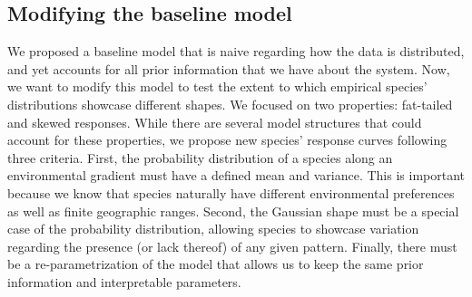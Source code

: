 \documentclass[11pt, a4paper]{article}
\begin{document}
\subsection*{Modifying the baseline model}


We proposed a baseline model that is naive regarding how the data is distributed, and yet accounts for all prior information that we have about the system. Now, we want to modify this model to test the extent to which empirical species' distributions showcase different shapes. We focused on two properties: fat-tailed and skewed responses. While there are several model structures that could account for these properties, we propose new species' response curves following three criteria. First, the probability distribution of a species along an environmental gradient must have a defined mean and variance. This is important because we know that species naturally have different environmental preferences as well as finite geographic ranges. Second, the Gaussian shape must be a special case of the probability distribution, allowing species to showcase variation regarding the presence (or lack thereof) of any given pattern. Finally, there must be a re-parametrization of the model that allows us to keep the same prior information and interpretable parameters.
\end{document}
